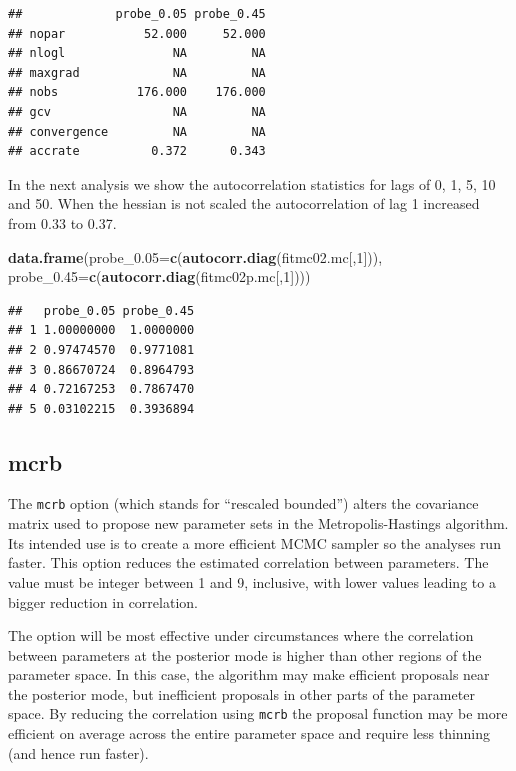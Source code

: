 \documentclass[
]{book}
\newenvironment{Shaded}{\begin{snugshade}}{\end{snugshade}}
\newcommand{\AttributeTok}[1]{\textcolor[rgb]{0.13,0.29,0.53}{#1}}
\newcommand{\DecValTok}[1]{\textcolor[rgb]{0.00,0.00,0.81}{#1}}
\newcommand{\FunctionTok}[1]{\textcolor[rgb]{0.13,0.29,0.53}{\textbf{#1}}}
\newcommand{\NormalTok}[1]{#1}
\begin{document}
\begin{verbatim}
##             probe_0.05 probe_0.45
## nopar           52.000     52.000
## nlogl               NA         NA
## maxgrad             NA         NA
## nobs           176.000    176.000
## gcv                 NA         NA
## convergence         NA         NA
## accrate          0.372      0.343
\end{verbatim}

In the next analysis we show the autocorrelation statistics for lags of 0, 1, 5, 10 and 50. When the hessian is not scaled the autocorrelation of lag 1 increased from 0.33 to 0.37.

\begin{Shaded}
\begin{Highlighting}[]
\FunctionTok{data.frame}\NormalTok{(}\AttributeTok{probe\_0.05=}\FunctionTok{c}\NormalTok{(}\FunctionTok{autocorr.diag}\NormalTok{(fitmc02.mc[,}\DecValTok{1}\NormalTok{])), }\AttributeTok{probe\_0.45=}\FunctionTok{c}\NormalTok{(}\FunctionTok{autocorr.diag}\NormalTok{(fitmc02p.mc[,}\DecValTok{1}\NormalTok{])))}
\end{Highlighting}
\end{Shaded}

\begin{verbatim}
##   probe_0.05 probe_0.45
## 1 1.00000000  1.0000000
## 2 0.97474570  0.9771081
## 3 0.86670724  0.8964793
## 4 0.72167253  0.7867470
## 5 0.03102215  0.3936894
\end{verbatim}

\hypertarget{mcrb}{%
\subsection{mcrb}\label{mcrb}}

The \texttt{mcrb} option (which stands for ``rescaled bounded'') alters the covariance matrix used to propose new parameter sets in the Metropolis-Hastings algorithm. Its intended use is to create a more efficient MCMC sampler so the analyses run faster. This option reduces the estimated correlation between parameters. The value must be integer between 1 and 9, inclusive, with lower values leading to a bigger reduction in correlation.

The option will be most effective under circumstances where the correlation between parameters at the posterior mode is higher than other regions of the parameter space. In this case, the algorithm may make efficient proposals near the posterior mode, but inefficient proposals in other parts of the parameter space. By reducing the correlation using \texttt{mcrb} the proposal function may be more efficient on average across the entire parameter space and require less thinning (and hence run faster).
\end{document}
